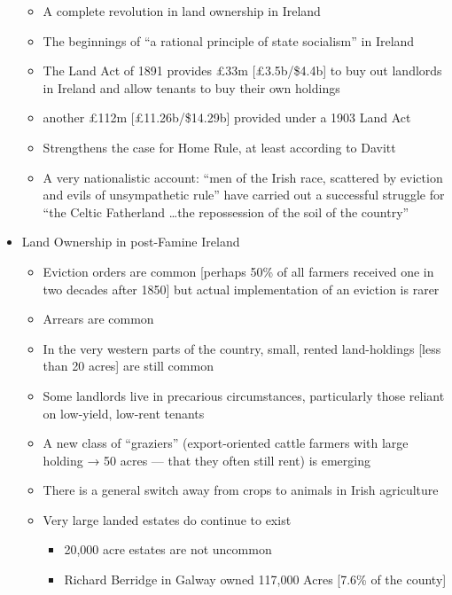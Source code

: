 \documentclass[12pt]{article}
\begin{document}
\begin{itemize}
\begin{itemize}
                    \item A complete revolution in land ownership in Ireland
                    \item The beginnings of ``a rational principle of state socialism'' in Ireland
                    \item The Land Act of 1891 provides £33m [£3.5b/\$4.4b] to buy out landlords in Ireland and allow tenants to buy their own holdings
                    \item another £112m [£11.26b/\$14.29b] provided under a 1903 Land Act
                    \item Strengthens the case for Home Rule, at least according to Davitt
                    \item A very nationalistic account: ``men of the Irish race, scattered by eviction and evils of unsympathetic rule'' have carried out a successful struggle for ``the Celtic Fatherland \dots the repossession of the soil of the country''
                \end{itemize}
                \item Land Ownership in post-Famine Ireland
                \begin{itemize}
                    \item Eviction orders are common [perhaps 50\% of all farmers received one in two decades after 1850] but actual implementation of an eviction is rarer
                    \item Arrears are common
                    \item In the very western parts of the country, small, rented land-holdings [less than 20 acres] are still common
                    \item Some landlords live in precarious circumstances, particularly those reliant on low-yield, low-rent tenants
                    \item A new class of ``graziers'' (export-oriented cattle farmers with large holding → 50 acres --- that they often still rent) is emerging
                    \item There is a general switch away from crops to animals in Irish agriculture
                    \item Very large landed estates do continue to exist
                    \begin{itemize}
                        \item 20,000 acre estates are not uncommon
                        \item Richard Berridge in Galway owned 117,000 Acres [7.6\% of the county]

\end{itemize}
\end{itemize}
\end{itemize}
\end{document}
